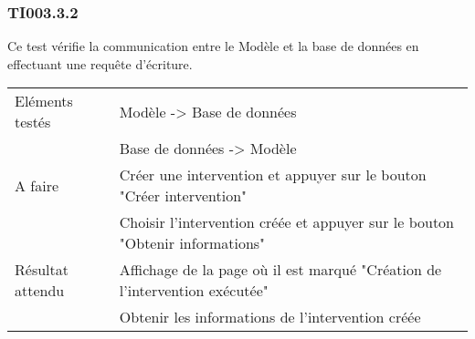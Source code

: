   		
  	\subsubsection{TI003.3.2}
  		Ce test vérifie la communication entre le Modèle et la base de données en effectuant une requête d'écriture.
  		\begin{center}
    	 		\begin{tabular}[h]{|p{}|p{}|}
			\hline
				Eléments testés & Modèle -> Base de données  \\
							    &  Base de données -> Modèle \\\hline
    				A faire & Créer une intervention et appuyer sur le bouton "Créer intervention" \\
    						& Choisir l'intervention créée et appuyer sur le bouton "Obtenir informations" \\\hline
    				Résultat attendu & Affichage de la page où il est marqué "Création de l'intervention exécutée" \\
    								 & Obtenir les informations de l'intervention créée \\\hline
     		\end{tabular}
  		\end{center}	
  		